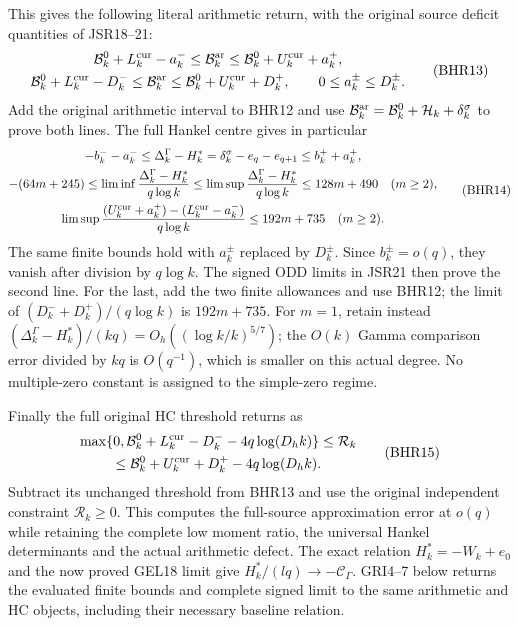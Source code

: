 \documentclass[11pt,a4paper]{article}
\begin{document}
This gives the following literal arithmetic return, with
the original source deficit quantities of JSR18--21:
\[
\begin{gathered}
 \mathcal B_k^0+L_k^{\rm cur}-a_k^-
 \leq\mathcal B_k^{\rm ar}
 \leq\mathcal B_k^0+U_k^{\rm cur}+a_k^+,\\
 \mathcal B_k^0+L_k^{\rm cur}-D_k^-
 \leq\mathcal B_k^{\rm ar}
 \leq\mathcal B_k^0+U_k^{\rm cur}+D_k^+,
 \qquad 0\leq a_k^\pm\leq D_k^\pm.
\end{gathered}\tag{BHR13}
\]
Add the original arithmetic interval to BHR12 and use
$\mathcal B_k^{\rm ar}=\mathcal B_k^0+
\mathcal H_k+\delta_k^\sigma$ to prove both lines.
The full Hankel centre gives in particular
\[
\begin{gathered}
 -b_k^--a_k^-\leq
 \Delta_k^\Gamma-H_k^*=\delta_k^\sigma-e_q-e_{q+1}
 \leq b_k^++a_k^+,\\
 -(64m+245)\leq\liminf\frac{\Delta_k^\Gamma-H_k^*}{q\log k}
 \leq\limsup\frac{\Delta_k^\Gamma-H_k^*}{q\log k}
 \leq128m+490\quad(m\geq2),\\
 \limsup\frac{(U_k^{\rm cur}+a_k^+)
                       -(L_k^{\rm cur}-a_k^-)}{q\log k}
 \leq192m+735\quad(m\geq2).
\end{gathered}\tag{BHR14}
\]
The same finite bounds hold with $a_k^\pm$ replaced by
$D_k^\pm$. Since $b_k^\pm=o(q)$, they vanish after
division by $q\log k$. The signed ODD limits in JSR21
then prove the second line. For the last, add the two
finite allowances and use BHR12; the limit of
$(D_k^-+D_k^+)/(q\log k)$ is $192m+735$.
For $m=1$, retain instead
$(\Delta_k^\Gamma-H_k^*)/(kq)
=O_h((\log k/k)^{5/7})$; the $O(k)$ Gamma comparison
error divided by $kq$ is $O(q^{-1})$, which is smaller
on this actual degree. No multiple-zero constant is
assigned to the simple-zero regime.

Finally the full original HC threshold returns as
\[
\begin{gathered}
 \max\{0,\mathcal B_k^0+L_k^{\rm cur}-D_k^-
                               -4q\log(D_hk)\}
 \leq\mathcal R_k\\
 \leq\mathcal B_k^0+U_k^{\rm cur}+D_k^+
                               -4q\log(D_hk).
\end{gathered}\tag{BHR15}
\]
Subtract its unchanged threshold from BHR13 and use
the original independent constraint $\mathcal R_k\geq0$.
This computes the full-source approximation error at
$o(q)$ while retaining the complete low moment ratio,
the universal Hankel determinants and the actual
arithmetic defect. The exact relation $H_k^*=-W_k+e_0$
and the now proved GEL18 limit give
$H_k^*/(lq)\to-\mathcal C_\Gamma$.
GRI4--7 below returns the evaluated finite bounds and
complete signed limit to the same arithmetic and HC objects,
including their necessary baseline relation.
\end{document}
